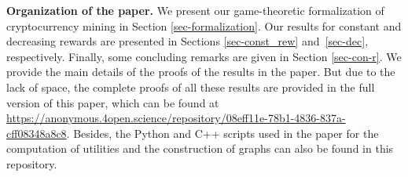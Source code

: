 
\smallskip
\noindent
{\bf Organization of the paper.} We present our game-theoretic formalization of cryptocurrency mining in Section \ref{sec-formalization}. Our results for constant and decreasing rewards are presented in Sections \ref{sec-const_rew} and~\ref{sec-dec}, respectively. Finally, some concluding remarks are given in Section \ref{sec-con-r}. We provide the main details of the proofs of the results in the paper. But due to the lack of space, the complete proofs of all these results are provided in the full version of this paper, which can be found at \url{https://anonymous.4open.science/repository/08eff11e-78b1-4836-837a-cff08348a8c8}. Besides, the Python and C++ scripts used in the paper for the computation of utilities and the construction of graphs can also be found in this repository.




